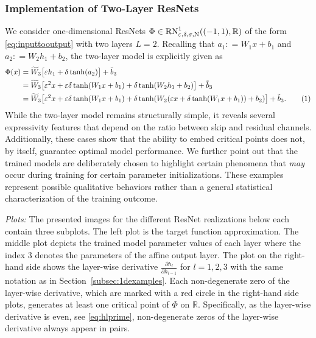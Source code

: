 \documentclass[10pt]{article}
\newcommand\numberthis{\addtocounter{equation}{1}\tag{\theequation}}
\theoremstyle{definition}
\numberwithin{equation}{section}
\newcommand{\eps}{\varepsilon}
\newcommand{\R}{\mathbb{R}}
\begin{document}
\subsubsection{Implementation of Two-Layer ResNets}\label{subsubsec:1d2l}
We consider one-dimensional ResNets $\Phi \in \textup{RN}^1_{\eps,\delta, \sigma, \textup{N}}((-1,1),\R)$ of the form \eqref{eq:inputtooutput} with two layers $L =2$. Recalling that $a_1: = W_1x+b_1$ and $a_2: = W_2 h_1+b_2$, the two-layer model is explicitly given as
    \begin{align*}
        \Phi(x) &= \widetilde{W}_3 \big[ \eps h_1 + \delta \tanh(a_2)\big]+\tilde{b}_3 \\
        &= \widetilde{W}_3 \big[ \eps^2 x + \eps \delta \tanh(W_1 x + b_1) + \delta \tanh(W_2 h_1 + b_2)\big]+\tilde{b}_3 \\
         &= \widetilde{W}_3 \big[ \eps^2 x + \eps \delta \tanh(W_1 x + b_1) + \delta \tanh(W_2 (\eps x + \delta \tanh(W_1 x + b_1)) + b_2)\big]+\tilde{b}_3.\numberthis \label{eq:resnet1d2l}
    \end{align*}
    While the two-layer model remains structurally simple, it reveals several expressivity features that depend on the ratio between skip and residual channels. Additionally, these cases show that the ability to embed critical points does not, by itself, guarantee optimal model performance. We further point out that the trained models are deliberately chosen to highlight certain phenomena that \emph{may} occur during training for certain parameter initializations. These examples represent possible qualitative behaviors rather than a general statistical characterization of the training outcome. \medskip

\noindent\emph{Plots:} The presented images for the different ResNet realizations below each contain three subplots. The left plot is the target function approximation. The middle plot depicts the trained model parameter values of each layer where the index $3$ denotes the parameters of the affine output layer. The plot on the right-hand side shows the layer-wise derivative $\frac{\partial h_l}{\partial h_{l -1}}$ for $l = 1,2,3$ with the same notation as in Section~\ref{subsec:1dexamples}. Each non-degenerate zero of the layer-wise derivative, which are marked with a red circle in the right-hand side plots, generates at least one critical point of $\Phi$ on $\R$. Specifically, as the layer-wise derivative is even, see \eqref{eq:hlprime}, non-degenerate zeros of the layer-wise derivative always appear in pairs.
  
\end{document}
